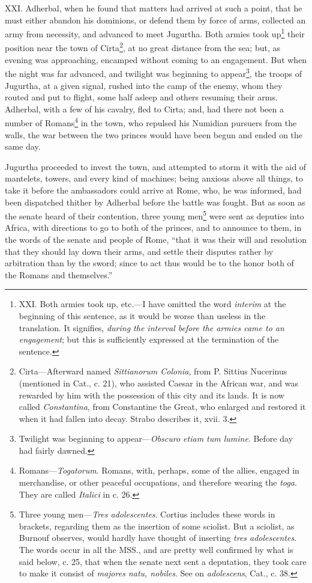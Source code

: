 XXI. Adherbal, when he found that matters had arrived at such a point,
that he must either abandon his dominions, or defend them by force of
arms, collected an army from necessity, and advanced to meet Jugurtha.
Both armies took up\footnote{XXI. Both armies took up, etc.—I have omitted the word
\emph{interim} at the beginning of this sentence, as it would be worse than
useless in the translation. It signifies, \emph{during the interval before
the armies came to an engagement}; but this is sufficiently expressed
at the termination of the sentence.} their position near the town of Cirta\footnote{Cirta—Afterward named \emph{Sittianorum Colonia}, from P. Sittius
Nucerinus (mentioned in Cat., c. 21), who assisted Caesar in the
African war, and was rewarded by him with the possession of this
city and its lands. It is now called \emph{Constantina}, from Constantine
the Great, who enlarged and restored it when it had fallen into decay.
Strabo describes it, xvii. 3.}, at
no great distance from the sea; but, as evening was approaching,
encamped without coming to an engagement. But when the night was far
advanced, and twilight was beginning to appear\footnote{Twilight was beginning to appear—\emph{Obscuro etiam tum lumine}.
Before day had fairly dawned.}, the troops of
Jugurtha, at a given signal, rushed into the camp of the enemy, whom
they routed and put to flight, some half asleep and others resuming
their arms. Adherbal, with a few of his cavalry, fled to Cirta; and,
had there not been a number of Romans\footnote{Romans—\emph{Togatorum}. Romans, with, perhaps, some of the
allies, engaged in merchandise, or other peaceful occupations, and
therefore wearing the \emph{toga}. They are called \emph{Italici} in c. 26.} in the town, who repulsed
his Numidian pursuers from the walls, the war between the two princes
would have been begun and ended on the same day.

Jugurtha proceeded to invest the town, and attempted to storm it with
the aid of mantelets, towers, and every kind of machines; being
anxious above all things, to take it before the ambassadors could
arrive at Rome, who, he was informed, had been dispatched thither by
Adherbal before the battle was fought. But as soon as the senate heard
of their contention, three young men\footnote{Three young men—\emph{Tres adolescentes}. Cortius includes these
words in brackets, regarding them as the insertion of some sciolist. But
a sciolist, as Burnouf observes, would hardly have thought of inserting
\emph{tres adolescentes}. The words occur in all the MSS., and are pretty
well confirmed by what is said below, c. 25, that when the senate next
sent a deputation, they took care to make it consist of \emph{majores natu,
nobiles}. See on \emph{adolescens}, Cat., c. 38.} were sent as deputies into
Africa, with directions to go to both of the princes, and to announce
to them, in the words of the senate and people of Rome, ``that it was
their will and resolution that they should lay down their arms, and
settle their disputes rather by arbitration than by the sword; since
to act thus would be to the honor both of the Romans and themselves.''

